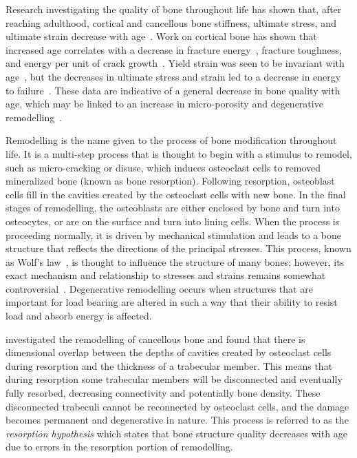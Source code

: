 Research investigating the quality of bone throughout life has shown that, after reaching adulthood, cortical and cancellous bone stiffness, ultimate stress, and ultimate strain decrease with age~\citep{mosekilde_age-related_1988, mccalden_age-related_1993, courtney_age-related_1996, mccalden_age-related_1997, zioupos_changes_1998, ohman_compressive_2011}.
Work on cortical bone has shown that increased age correlates with a decrease in fracture energy~\citep{zioupos_changes_1998, mccalden_age-related_1993}, fracture toughness, and energy per unit of crack growth~\citep{zioupos_changes_1998}.
Yield strain was seen to be invariant with age~\citep{mccalden_age-related_1993, ohman_compressive_2011}, but the decreases in ultimate stress and strain led to a decrease in energy to failure~\citep{mccalden_age-related_1993}.
These data are indicative of a general decrease in bone quality with age, which may be linked to an increase in micro-porosity and degenerative remodelling~\citep{mccalden_age-related_1993}.

Remodelling is the name given to the process of bone modification throughout life.
It is a multi-step process that is thought to begin with a stimulus to remodel, such as micro-cracking or disuse, which induces osteoclast cells to removed mineralized bone (known as bone resorption).
Following resorption, osteoblast cells fill in the cavities created by the osteoclast cells with new bone.
In the final stages of remodelling, the osteoblasts are either enclosed by bone and turn into osteocytes, or are on the surface and turn into lining cells.
When the process is proceeding normally, it is driven by mechanical stimulation and leads to a bone structure that reflects the directions of the principal stresses. This process, known as Wolf's law~\citep{wolff_law_1986}, is thought to influence the structure of many bones; however, its exact mechanism and relationship to stresses and strains remains somewhat controversial~\citep{skedros_mathematical_2007}.
Degenerative remodelling occurs when structures that are important for load bearing are altered in such a way that their ability to resist load and absorb energy is affected.

\citet{parfitt_trabecular_1987} investigated the remodelling of cancellous bone and found that there is dimensional overlap between the depths of cavities created by osteoclast cells during resorption and the thickness of a trabecular member.
This means that during resorption some trabecular members will be disconnected and eventually fully resorbed, decreasing connectivity and potentially bone density.
These disconnected trabeculi cannot be reconnected by osteoclast cells, and the damage becomes permanent and degenerative in nature.
This process is referred to as the \textit{resorption hypothesis} which states that bone structure quality decreases with age due to errors in the resorption portion of remodelling.

